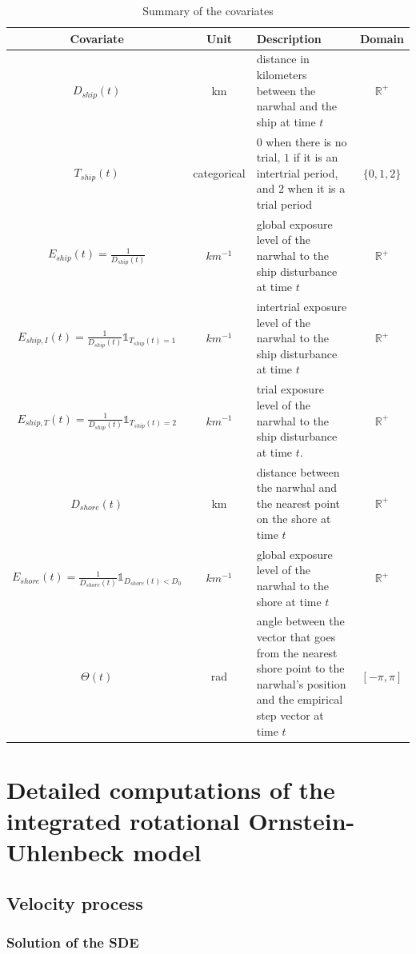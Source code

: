 \documentclass[11pt]{article}
\newcommand {\R}{\mathbb{R}}
\newcommand {\1}{\mathbb{1}}
\begin{document}
\begin{table}[H]
	\centering
	\begin{tabular}{|c|c|p{8cm}|c|}
		\hline
		Covariate & Unit & Description & Domain \\
		\hline
		$D_{ship}(t)$ & km & distance in kilometers between the narwhal and the ship at time $t$ & $\R^+$ \\
		\hline
		$T_{ship}(t)$  & categorical & $0$ when there is no trial, $1$ if it is an intertrial period, and $2$ when it is a trial period & $\{0,1,2\}$\\
		\hline
		$E_{ship}(t)=\frac{1}{D_{ship}(t)}$ & $km^{-1}$ & global exposure level of the narwhal to the ship disturbance at time $t$ & $\R^+$ \\
		\hline
		$E_{ship,I}(t)=\frac{1}{D_{ship}(t)}\mathbb{1}_{T_{ship}(t)=1}$& $km^{-1}$ & intertrial exposure level of the narwhal to the ship disturbance at time $t$ & $\R^+$ \\
		\hline
		$E_{ship,T}(t)=\frac{1}{D_{ship}(t)}\mathbb{1}_{T_{ship}(t)=2}$ & $km^{-1}$ & trial exposure level of the narwhal to the ship disturbance at time $t$. & $\R^+$\\
		\hline
		$D_{shore}(t)$ & km & distance between the narwhal and the nearest point on the shore at time $t$ & $\R^+$ \\
		\hline
		$E_{shore}(t)=\frac{1}{D_{shore}(t)} \1_{D_{shore}(t)<D_0}$ & $km^{-1}$ & global exposure level of the narwhal to the shore at time $t$ & $\R^+$ \\
		\hline
		$\Theta(t)$ & rad & angle between the vector that goes from the nearest shore point to the narwhal's position and the empirical step vector at time $t$  & $[-\pi,\pi]$ \\
		\hline 
	\end{tabular}
	\caption{Summary of the covariates}
	\label{tab: covariates}
\end{table}


\section{Detailed computations of the integrated rotational Ornstein-Uhlenbeck model}
\label{section: detailed RACVM computations}

\subsection{Velocity process}

\subsubsection{Solution of the SDE}
\end{document}
